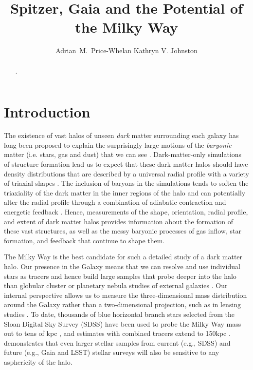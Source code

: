 \documentclass{emulateapj}
\begin{document}
\title{Spitzer, Gaia and the Potential of the Milky Way}

\author{Adrian~M.~Price-Whelan Kathryn V. Johnston}


\begin{abstract}
.
\end{abstract}


\section{Introduction}
\label{intro.sec}
 The existence of vast halos of unseen {\it dark} matter surrounding each galaxy has long been proposed to explain the surprisingly large
motions of the {\it baryonic} matter (i.e. stars, gas and dust) that we can see \citep[e.g.,][]{zwicky37,rubin70}.
Dark-matter-only simulations of structure formation lead us to expect that these dark matter halos should have density distributions that are described by a universal radial profile \citep{navarro96} with a variety of triaxial shapes \citep{jing02}.
The inclusion of baryons in the simulations tends to soften the triaxiality of the dark matter in the inner regions of the halo \citep[e.g., as the disk forms,][]{bailin05} and
can potentially alter the radial profile through a combination of adiabatic contraction and energetic feedback \citep[see recent discussion by][]{pontzen12}.
Hence, measurements of the shape, orientation, radial profile, and extent of dark matter halos provides information about the formation of these vast structures, as well as the messy baryonic processes of gas inflow, star formation, and feedback that continue to shape them.

The Milky Way is the best candidate for such a detailed study of a dark matter halo. 
Our presence in the Galaxy means that we can resolve and use individual stars as tracers and hence build large samples that probe deeper into the halo than globular cluster
or planetary nebula studies of external galaxies \citep[e.g.][]{mendez01,cote03}. Our internal perspective allows us to measure the three-dimensional mass distribution around the Galaxy rather than a two-dimensional projection, such as in lensing studies \citep{bolton06}.
To date, thousands of blue horizontal branch stars selected from the Sloan Digital Sky Survey (SDSS) have been used to probe the Milky Way mass out to tens of
kpc \citep[SDSS, see][]{deason12a,kafle12}, and estimates with combined tracers extend to 150kpc \citep{deason12b}.
\citet{loebman12} demonstrates that even larger stellar samples from current (e.g., SDSS) and future  (e.g., Gaia and LSST) stellar surveys will also be sensitive to any
asphericity of the halo.
\end{document}
